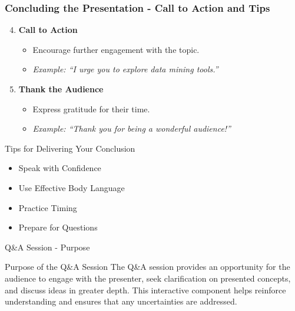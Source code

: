 \documentclass[aspectratio=169]{beamer}
\begin{document}
\begin{frame}[fragile]
    \frametitle{Concluding the Presentation - Call to Action and Tips}
    \begin{enumerate}
        \setcounter{enumi}{3}
        \item \textbf{Call to Action}
              \begin{itemize}
                  \item Encourage further engagement with the topic.
                  \item \textit{Example: “I urge you to explore data mining tools.”}
              \end{itemize}
        \item \textbf{Thank the Audience}
              \begin{itemize}
                  \item Express gratitude for their time.
                  \item \textit{Example: “Thank you for being a wonderful audience!”}
              \end{itemize}
    \end{enumerate}
    
    \begin{block}{Tips for Delivering Your Conclusion}
        \begin{itemize}
            \item Speak with Confidence
            \item Use Effective Body Language
            \item Practice Timing
            \item Prepare for Questions
        \end{itemize}
    \end{block}
\end{frame}

\begin{frame}[fragile]{Q\&A Session - Purpose}
    \begin{block}{Purpose of the Q\&A Session}
        The Q\&A session provides an opportunity for the audience to engage with the presenter, seek clarification on presented concepts, and discuss ideas in greater depth. This interactive component helps reinforce understanding and ensures that any uncertainties are addressed.
    \end{block}
\end{frame}
\end{document}
